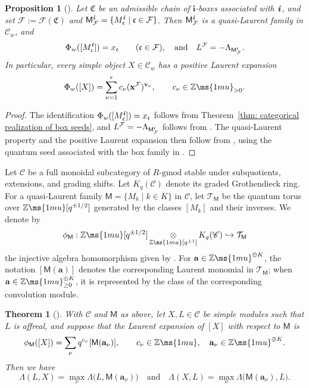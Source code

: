 \documentclass[12pt, leqno]{amsart}
\numberwithin{equation}{section}
\theoremstyle{plain}
\newtheorem{proposition}[lemma]{Proposition}
\newtheorem{theorem}[lemma]{Theorem}
\theoremstyle{definition}
\newcommand{\seteq}{\mathbin{:=}}
\newcommand{\tens}{\mathop\otimes}
\newcommand{\Z}{\mathbb{Z}\ms{1mu}}
\newcommand{\ii}{ \textbf{\textit{i}}}
\newcommand{\frakC}{\mathfrak{C}}
\newcommand{\frakc}{\mathfrak{c}}
\newcommand{\sfM}{\mathsf{M}}
\newcommand{\bfa}{\mathbf{a}}
\newcommand{\bfi}{\mathbf{i}}
\newcommand{\bfv}{\mathbf{v}}
\newcommand{\bfx}{\mathbf{x}}
\newcommand{\calF}{\mathcal{F}}
\newcommand{\calT}{\mathcal{T}}
\newcommand{\scrC}{\mathscr{C}}
\newcommand{\qtq}[1][{and}]{\quad\text{{#1}}\quad}
\begin{document}
\begin{proposition}[{\cite[Proposition~3.6 and Corollary~3.4]{KKOP23F}}]
\label{prop: Laurent maximum realization of box seed}
 Let \(\frakC\) be an admissible chain of \(\bfi\)-boxes associated
with \(\ii\), and set
$\calF\seteq\calF(\frakC)$
and
$\sfM^\ii_\calF = \{M_\frakc^\ii\mid\frakc\in\calF\}$.
Then \(\sfM^\ii_\calF\) is a quasi-Laurent family in
\(\scrC_w\), and 
\[
\Phi_w([M_\frakc^\ii])=x_\frakc
\qquad(\frakc\in\calF),
\qtq
L^\calF=-\Lambda_{\sfM^\ii_\calF}.
\]
In particular, every simple object \(X\in\scrC_w\) has a positive
Laurent expansion
\begin{equation}\label{eq: categorical Laurent expansion for box seed}
\Phi_w([X])
=
\sum_{\nu=1}^r c_\nu(\bfx^\calF)^{\bfv_\nu},
\qquad
c_\nu\in\Z_{>0}.
\end{equation}
\end{proposition}
\begin{proof}
The identification \(\Phi_w([M_\frakc^\ii])=x_\frakc\) follows
from Theorem~\ref{thm: categorical realization of box seeds},
and \(L^\calF=-\Lambda_{\sfM^\ii_\calF}\) follows from
\cite[Propositions~5.7 and~5.9]{KKOP23F}.
The quasi-Laurent property and the positive Laurent expansion
then follow from \cite[Proposition~3.6 and Corollary~3.4]{KKOP23F},
using the quantum seed associated with the box family in
\cite[Section~5.1.4 and Theorem~5.20]{KK24}.
\end{proof}


Let \(\scrC\) be a full monoidal subcategory of \(R\text{-gmod}\)
stable under subquotients, extensions, and grading shifts.
Let \(K_q(\scrC)\) denote its graded Grothendieck ring.
For a quasi-Laurent family
\(\sfM=\{M_k\mid k\in K\}\) in \(\scrC\), let
\(\calT_{\sfM}\) be the quantum torus over \(\Z[q^{\pm1/2}]\)
generated by the classes \([M_k]\) and their inverses.
We denote by
\[
\phi_{\sfM}:
\Z[q^{\pm1/2}]\tens_{\Z[q^{\pm1}]}K_q(\scrC)
\hookrightarrow \calT_{\sfM}
\]
the injective algebra homomorphism given by
\cite[Lemma~2.12]{KKOP26}. 
For \(\bfa\in\Z^{\oplus K}\), the notation
\([\sfM(\bfa)]\) denotes the corresponding Laurent monomial in
\(\calT_{\sfM}\); when
\(\bfa\in\Z_{\geq0}^{\oplus K}\), it is represented by the class
of the corresponding convolution module.

\begin{theorem}[{\cite[Theorem~2.13]{KKOP26}}]
\label{thm: KKOP Laurent maximum}
With \(\scrC\) and \(\sfM\) as above, let \(X,L\in\scrC\) be simple
modules such that \(L\) is affreal, and suppose that the Laurent
expansion of \([X]\) with respect to \(\sfM\) is
\[
\phi_{\sfM}([X])
=
\sum_\nu q^{c_\nu}[\sfM(\bfa_\nu)],
\qquad
c_\nu\in\Z, \quad
\bfa_\nu\in\Z^{\oplus K}.
\]
Then we have 
\[
\Lambda(L,X) = \max_\nu\Lambda\bigl(L,\sfM(\bfa_\nu)\bigr)
\qtq
\Lambda(X,L) = \max_\nu\Lambda\bigl(\sfM(\bfa_\nu),L\bigr).
\]
\end{theorem}
\end{document}
